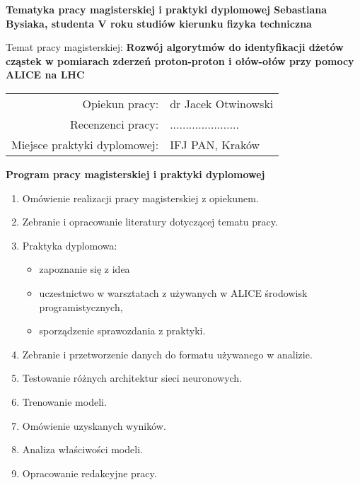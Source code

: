 
\newpage
{}
\begin{center}
{\bf Tematyka pracy magisterskiej i praktyki dyplomowej
Sebastiana Bysiaka,
studenta V roku studiów kierunku fizyka techniczna}\\
\end{center}

Temat pracy magisterskiej:
{\bf Rozwój algorytmów do identyfikacji dżetów cząstek w pomiarach zderzeń proton-proton i ołów-ołów przy pomocy ALICE na LHC}\\

\begin{tabular}{rl}

Opiekun pracy:                  & dr Jacek Otwinowski\\
Recenzenci pracy:               & ......................\\
Miejsce praktyki dyplomowej:    & IFJ PAN, Kraków\\
\end{tabular}

\begin{center}
{\bf Program pracy magisterskiej i praktyki dyplomowej}
\end{center}

\begin{enumerate}
\item Omówienie realizacji pracy magisterskiej z opiekunem.
\item Zebranie i opracowanie literatury dotyczącej tematu pracy.
\item Praktyka dyplomowa:
\begin{itemize}
\item zapoznanie się z idea
\item uczestnictwo w warsztatach z używanych w ALICE środowisk programistycznych,
\item sporządzenie sprawozdania z praktyki.
\end{itemize}
\item Zebranie i przetworzenie danych do formatu używanego w analizie.
\item Testowanie różnych architektur sieci neuronowych.
\item Trenowanie modeli.
\item Omówienie uzyskanych wyników.
\item Analiza właściwości modeli.
\item Opracowanie redakcyjne pracy.
\end{enumerate}


